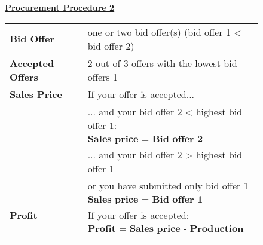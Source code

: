 \documentclass[11pt]{scrartcl}
\begin{document}
{\begin{figure}[ht!]
\begin{minipage}[t]{1\linewidth}
\begin{tcolorbox}[arc=0pt,colframe=black!25]
			\textbf{\underline{Procurement Procedure 2}} ~\bigskip

				\begin{tabular}{ll} \medbreak
					\textbf{Bid Offer} 				& one or two bid offer(s) (bid offer 1 < bid offer 2) \\ \medbreak
					\textbf{Accepted Offers} 		& 2 out of 3 offers with the lowest bid offers 1 \\ \medbreak
					\textbf{Sales Price} 			& If your offer is accepted... \\ 
													& ... and your bid offer 2 < highest bid offer 1: \\ \medbreak
													& \hspace{0.8cm} $\textbf{Sales price = Bid offer 2}$ \\ 
													& ... and your bid offer 2 > highest bid offer 1 \\
													& \hspace{0.4cm} or you have submitted only bid offer 1 \\ \medbreak
													& \hspace{0.8cm} $\textbf{Sales price = Bid offer 1}$ \\ 
					\textbf{Profit}					& If your offer is accepted: \\ 
													& \hspace{0.8cm} $\textbf{Profit = Sales price - Production cost}$ \\
					\hspace{3.75cm}					& 	   
				\end{tabular} 
 
		\end{tcolorbox} 
	\end{minipage}  
  \end{figure}
 \clearpage
 \restoregeometry
}

~\newpage


\end{document}
